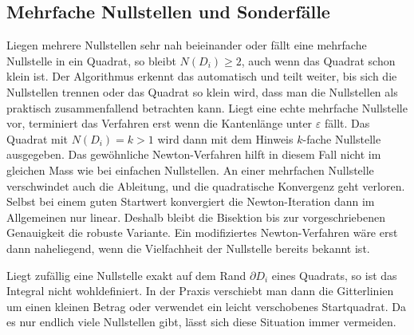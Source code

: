 \subsection{Mehrfache Nullstellen und Sonderfälle%
\label{weyl:subsection:mehrfache}}
Liegen mehrere Nullstellen sehr nah beieinander oder fällt eine mehrfache Nullstelle
in ein Quadrat, so bleibt $N(D_i) \geq 2$, auch wenn das Quadrat schon klein ist.
Der Algorithmus erkennt das automatisch und teilt weiter, bis sich die Nullstellen
trennen oder das Quadrat so klein wird, dass man die Nullstellen als praktisch
zusammenfallend betrachten kann.
%
Liegt eine echte mehrfache Nullstelle vor, terminiert das Verfahren erst wenn die
Kantenlänge unter $\varepsilon$ fällt. Das Quadrat mit $N(D_i) = k > 1$ wird dann mit
dem Hinweis {$k$-fache Nullstelle} ausgegeben.
Das gewöhnliche Newton-Verfahren hilft in diesem Fall nicht im gleichen Mass wie
bei einfachen Nullstellen. An einer mehrfachen Nullstelle verschwindet auch die
Ableitung, und die quadratische Konvergenz geht verloren. Selbst bei einem guten
%
Startwert konvergiert die Newton-Iteration dann im Allgemeinen nur linear. Deshalb
bleibt die Bisektion bis zur vorgeschriebenen Genauigkeit die robuste Variante.
Ein modifiziertes Newton-Verfahren wäre erst dann naheliegend, wenn die
Vielfachheit der Nullstelle bereits bekannt ist.

Liegt zufällig eine Nullstelle exakt auf dem Rand $\partial D_i$ eines Quadrats, so ist
das Integral nicht wohldefiniert.
In der Praxis verschiebt man dann die Gitterlinien um einen kleinen Betrag oder
verwendet ein leicht verschobenes Startquadrat. Da es nur endlich viele Nullstellen
gibt, lässt sich diese Situation immer vermeiden.
